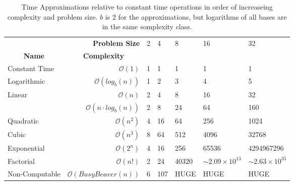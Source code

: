 \documentclass[12pt, letterpaper]{book}
\begin{document}
\begin{table}[h]
\centering
\begin{tabular}{lrlllll}
\multicolumn{1}{r}{} & {\bf Problem Size} & 2 & 4 & 8 & 16 & 32 \\
\multicolumn{1}{c}{{\bf Name}} & \multicolumn{1}{c}{{\bf Complexity}} &  &  &  &  &  \\ \cline{3-7} 
Constant Time & \multicolumn{1}{r|}{$\mathcal{O}(1)$} & \multicolumn{1}{l|}{1} & \multicolumn{1}{l|}{1} & \multicolumn{1}{l|}{1} & \multicolumn{1}{l|}{1} & \multicolumn{1}{l|}{1} \\ \cline{3-7} 
Logarithmic & \multicolumn{1}{r|}{$\mathcal{O}(log_{b}(n))$} & \multicolumn{1}{l|}{1} & \multicolumn{1}{l|}{2} & \multicolumn{1}{l|}{3} & \multicolumn{1}{l|}{4} & \multicolumn{1}{l|}{5} \\ \cline{3-7} 
Linear & \multicolumn{1}{r|}{$\mathcal{O}(n)$} & \multicolumn{1}{l|}{2} & \multicolumn{1}{l|}{4} & \multicolumn{1}{l|}{8} & \multicolumn{1}{l|}{16} & \multicolumn{1}{l|}{32} \\ \cline{3-7} 
 & \multicolumn{1}{r|}{$\mathcal{O}(n \cdot log_{b}(n))$} & \multicolumn{1}{l|}{2} & \multicolumn{1}{l|}{8} & \multicolumn{1}{l|}{24} & \multicolumn{1}{l|}{64} & \multicolumn{1}{l|}{160} \\ \cline{3-7} 
Quadratic & \multicolumn{1}{r|}{$\mathcal{O}(n^{2})$} & \multicolumn{1}{l|}{4} & \multicolumn{1}{l|}{16} & \multicolumn{1}{l|}{64} & \multicolumn{1}{l|}{256} & \multicolumn{1}{l|}{1024} \\ \cline{3-7} 
Cubic & \multicolumn{1}{r|}{$\mathcal{O}(n^{3})$} & \multicolumn{1}{l|}{8} & \multicolumn{1}{l|}{64} & \multicolumn{1}{l|}{512} & \multicolumn{1}{l|}{4096} & \multicolumn{1}{l|}{32768} \\ \cline{3-7} 
Exponential & \multicolumn{1}{r|}{$\mathcal{O}(2^{n})$} & \multicolumn{1}{l|}{4} & \multicolumn{1}{l|}{16} & \multicolumn{1}{l|}{256} & \multicolumn{1}{l|}{65536} & \multicolumn{1}{l|}{4294967296} \\ \cline{3-7} 
Factorial & \multicolumn{1}{r|}{$\mathcal{O}(n!)$} & \multicolumn{1}{l|}{2} & \multicolumn{1}{l|}{24} & \multicolumn{1}{l|}{40320} & \multicolumn{1}{l|}{$\sim 2.09 \times 10^{13}$} & \multicolumn{1}{l|}{$\sim 2.63 \times 10^{35}$} \\ \cline{3-7} 
Non-Computable & \multicolumn{1}{r|}{$\mathcal{O}(BusyBeaver(n))$} & \multicolumn{1}{l|}{6} & \multicolumn{1}{l|}{107} & \multicolumn{1}{l|}{HUGE} & \multicolumn{1}{l|}{HUGE} & \multicolumn{1}{l|}{HUGE} \\ \cline{3-7} 
\end{tabular}
\caption{Time Approximations relative to constant time operations in order of increaseing complexity and problem size. $b$ is 2 for the approximations, but logarithms of all bases are in the same somplexity class.}
\label{Figure:TimeComplexities}
\end{table}
\end{document}
